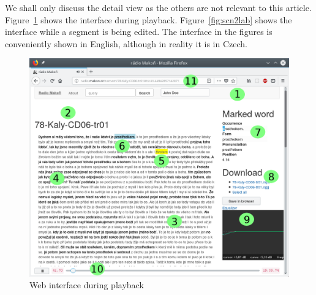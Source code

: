 \documentclass{svproc}
\begin{document}
We shall only discuss the detail view as the others are not relevant to this
article. Figure~\ref{fig:scn1lab} shows the interface during playback.
Figure~\ref{fig:scn2lab} shows the interface while a segment is being edited.
The interface in the figures is conveniently shown in English, although in
reality it is in Czech.

\begin{figure}[htpb]
\includegraphics[scale=0.6]{rc/radio-makon-en-1-lab.png}
\caption{Web interface during playback}
\label{fig:scn1lab}
\end{figure}
\end{document}
